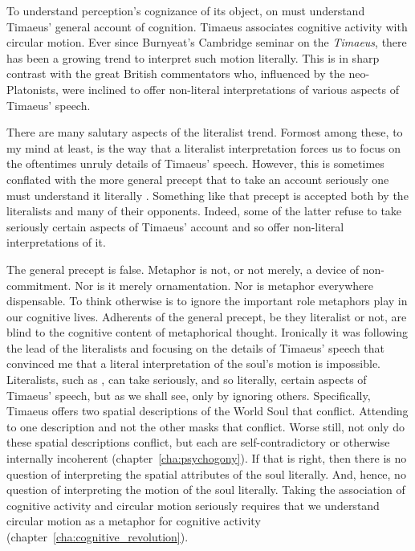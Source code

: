 To understand perception's cognizance of its object, on must understand Timaeus' general account of cognition. Timaeus associates cognitive activity with circular motion. Ever since Burnyeat's Cambridge seminar on the \emph{Timaeus}, there has been a growing trend to interpret such motion literally. This is in sharp contrast with the great British commentators who, influenced by the neo-Platonists, were inclined to offer non-literal interpretations of various aspects of Timaeus' speech. 

There are many salutary aspects of the literalist trend. Formost among these, to my mind at least, is the way that a literalist interpretation forces us to focus on the oftentimes unruly details of Timaeus' speech. However, this is sometimes conflated with the more general precept that to take an account seriously one must understand it literally \citep[see][7]{Broadie:2012vl}. Something like that precept is accepted both by the literalists and many of their opponents. Indeed, some of the latter refuse to take seriously certain aspects of Timaeus' account and so offer non-literal interpretations of it.

The general precept is false. Metaphor is not, or not merely, a device of non-commit\-ment. Nor is it merely ornamentation. Nor is metaphor everywhere dispensable. To think otherwise is to ignore the important role metaphors play in our cognitive lives. Adherents of the general precept, be they literalist or not, are blind to the cognitive content of metaphorical thought. Ironically it was following the lead of the literalists and focusing on the details of Timaeus' speech that convinced me that a literal interpretation of the soul's motion is impossible. Literalists, such as \citet{Sedley:1997kr}, can take seriously, and so literally, certain aspects of Timaeus' speech, but as we shall see, only by ignoring others. Specifically, Timaeus offers two spatial descriptions of the World Soul that conflict. Attending to one description and not the other masks that conflict. Worse still, not only do these spatial descriptions conflict, but each are self-contradictory or otherwise internally incoherent (chapter~\ref{cha:psychogony}). If that is right, then there is no question of interpreting the spatial attributes of the soul literally. And, hence, no question of interpreting the motion of the soul literally. Taking the association of cognitive activity and circular motion seriously requires that we understand circular motion as a metaphor for cognitive activity (chapter~\ref{cha:cognitive_revolution}). 

